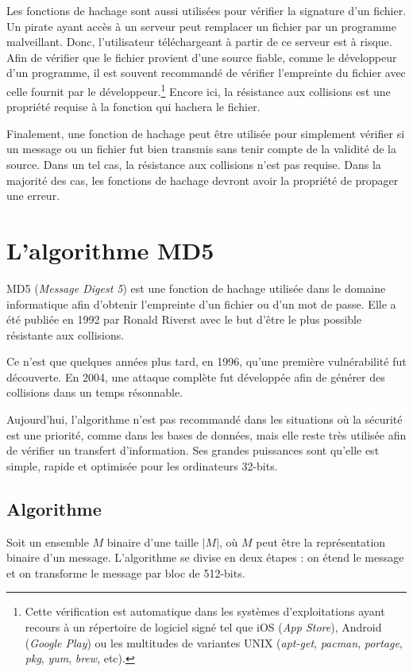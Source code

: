 \documentclass[11pt]{article}
\begin{document}
Les fonctions de hachage sont aussi utilisées pour vérifier la signature d'un fichier. Un pirate ayant accès à un serveur peut remplacer un fichier par un programme malveillant. Donc, l'utilisateur téléchargeant à partir de ce serveur est à risque. Afin de vérifier que le fichier provient d'une source fiable, comme le développeur d'un programme, il est souvent recommandé de vérifier l'empreinte du fichier avec celle fournit par le développeur.\footnote{Cette vérification est automatique dans les systèmes d'exploitations ayant recours à un répertoire de logiciel signé tel que iOS (\textit{App Store}), Android (\textit{Google Play}) ou les multitudes de variantes UNIX (\textit{apt-get}, \textit{pacman}, \textit{portage}, \textit{pkg}, \textit{yum}, \textit{brew}, etc).}
 Encore ici, la résistance aux collisions est une propriété requise à la fonction qui hachera le fichier.

Finalement, une fonction de hachage peut être utilisée pour simplement vérifier si un message ou un fichier fut bien transmis sans tenir compte de la validité de la source. Dans un tel cas, la résistance aux collisions n'est pas requise. Dans la majorité des cas, les fonctions de hachage devront avoir la propriété de propager une erreur.

\section{L'algorithme MD5}
MD5 (\textit{Message Digest 5}) est une fonction de hachage utilisée dans le domaine informatique afin d'obtenir l'empreinte d'un fichier ou d'un mot de passe. Elle a été publiée en 1992 par Ronald Riverst avec le but d'être le plus possible résistante aux collisions.\cite{rfc1321}

Ce n'est que quelques années plus tard, en 1996, qu'une première vulnérabilité fut découverte. En 2004, une attaque complète fut développée afin de générer des collisions dans un temps résonnable.\cite{md5flaw}

Aujourd'hui, l'algorithme n'est pas recommandé dans les situations où la sécurité est une priorité, comme dans les bases de données, mais elle reste très utilisée afin de vérifier un transfert d'information. Ses grandes puissances sont qu'elle est simple, rapide et optimisée pour les ordinateurs 32-bits.\cite{rfc1321}

\subsection{Algorithme}
Soit un ensemble $M$ binaire d'une taille $|M|$, où $M$ peut être la représentation binaire d'un message. L'algorithme se divise en deux étapes : on étend le message et on transforme le message par bloc de 512-bits.
\begin{figure}[H]
  \centering
  
\end{figure}
\end{document}
